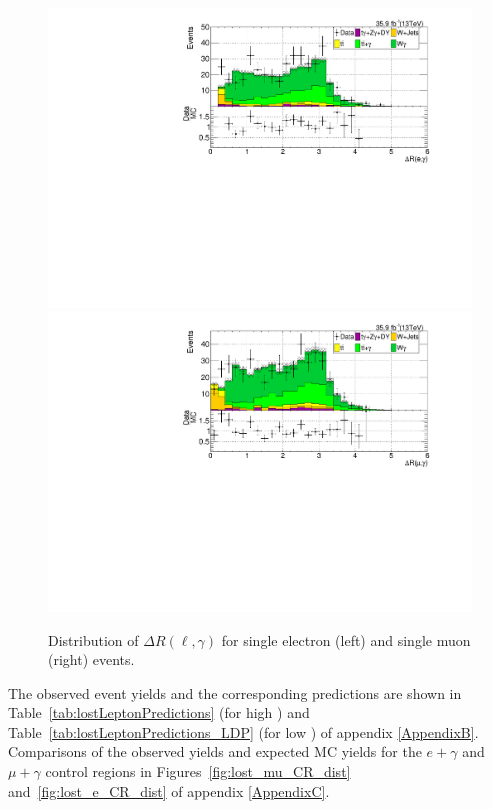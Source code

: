 \begin{figure}
\centering
\includegraphics[width=0.48\linewidth]{../Figures/Chap3/lost_lepton/lostElectronDeltaR.pdf}
\includegraphics[width=0.48\linewidth]{../Figures/Chap3/lost_lepton/lostMuonDeltaR.pdf}
\captionsetup{width=.9\linewidth}
\caption[$\Delta R(\ell,\gamma)$ for $\mu\gamma$ and $e\gamma$ CRs]{Distribution of $\Delta R(\ell,\gamma)$ for single
electron (left) and single muon (right) events.}
\label{fig:lost_ell_dR_dist}
\end{figure}

The observed event yields and the corresponding predictions are shown in Table~\ref{tab:lostLeptonPredictions} (for high \dphi) and Table~\ref{tab:lostLeptonPredictions_LDP} (for low \dphi) of appendix \ref{AppendixB}. 
Comparisons of the observed yields and expected MC yields for the $e+\gamma$ and $\mu+\gamma$ control 
regions in Figures~\ref{fig:lost_mu_CR_dist} and~\ref{fig:lost_e_CR_dist} of appendix \ref{AppendixC}.

